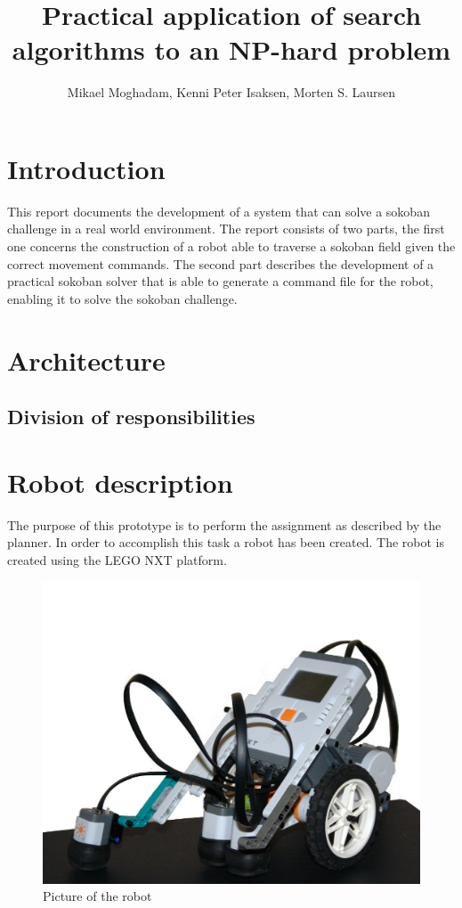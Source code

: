 \documentclass[final, english, a4paper]{article}
\title{Practical application of search algorithms to an NP-hard problem}
\author{Mikael Moghadam, Kenni Peter Isaksen, Morten S. Laursen}
\begin{document}
\maketitle %


%
%
\newpage
\section{Introduction}
This report documents the development of a system that can solve a sokoban challenge in a real world environment. The report consists of two parts, the first one concerns the construction of a robot able to traverse a sokoban field given the correct movement commands. The second part describes the development of a practical sokoban solver that is able to generate a command file for the robot, enabling it to solve the sokoban challenge.
\newpage
\tableofcontents
\newpage
\section{Architecture}
	\subsection{Division of responsibilities}
	
\section{Robot description}
        The purpose of this prototype is to perform the assignment as described by
        the planner. In order to accomplish this task a robot 
        has been created. The robot is created using the LEGO NXT platform. 
        \begin{figure}[htp]
            \centering
    	    \includegraphics[scale=0.3]{robot2}
	        \caption{Picture of the robot}\label{fig:robotPic}
        \end{figure} 
\end{document}
